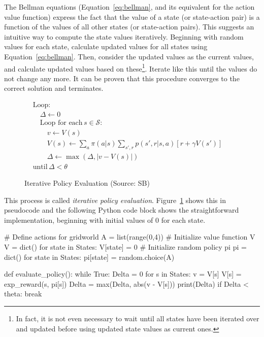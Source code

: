 The Bellman equations (Equation~\ref{eq:bellman}, and its equivalent for the action value function) express the fact that the value of a state (or state-action pair) is a function of the values of all other states (or state-action pairs). This suggests an intuitive way to compute the state values iteratively. Beginning with random values for each state, calculate updated values for all states using Equation~\ref{eq:bellman}. Then, consider the updated values as the current values, and calculate updated values based on these\footnote{In fact, it is not even necessary to wait until all states have been iterated over and updated before using updated state values as current ones.}. Iterate like this until the values do not change any more. It can be proven that this procedure converges to the correct solution and terminates. 


\begin{figure}
\small
\begin{tcolorbox}[colback=code]
\vspace{-\baselineskip}
\begin{align*}
&\text{Loop:} \\
&\quad \Delta \leftarrow 0 \\
&\quad \text{Loop for each}\, s \in \mathcal{S}: \\
&\quad \quad v \leftarrow V(s) \\
&\quad \quad V(s) \leftarrow \sum\nolimits_a \pi(a|s) \sum\nolimits_{s', r} p(s', r|s, a)[r + \gamma V(s')] \hspace{1in} \\
&\quad \quad \Delta \leftarrow \max (\Delta, |v - V(s)|) \\
&\text{until}\, \Delta < \theta
\end{align*}
\end{tcolorbox}
\caption{Iterative Policy Evaluation (Source: SB)}
\label{fig:policyiteration}
\end{figure}

This process is called \emph{iterative policy evaluation}. Figure~\ref{fig:policyiteration} shows this in pseudocode and the following Python code block shows the straightforward implementation, beginning with initial values of $0$ for each state.

\begin{samepage}
\begin{pythoncode}
# Define actions for gridworld
A = list(range(0,4))
# Initialize value function V
V = dict()
for state in States:
    V[state] = 0
# Initialize random policy pi
pi = dict()
for state in States:
    pi[state] = random.choice(A)

def evaluate_policy():
    while True:
        Delta = 0
        for s in States:
            v = V[s]
            V[s] = exp_reward(s, pi[s])
            Delta = max(Delta, abs(v - V[s]))
        print(Delta)
        if Delta < theta:
            break
\end{pythoncode}
\end{samepage}


